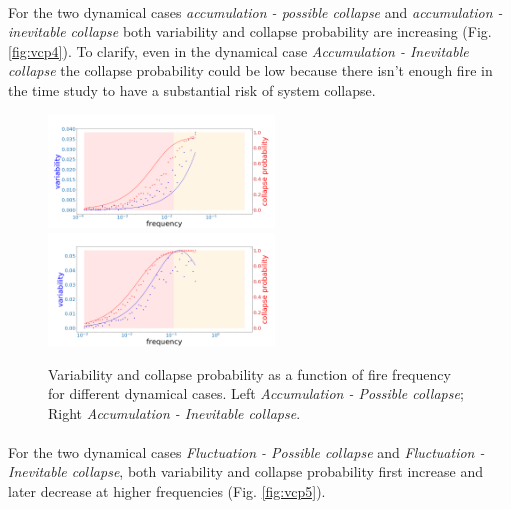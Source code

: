 \documentclass{article}
\begin{document}
\paragraph{}
For the two dynamical cases \textit{accumulation - possible collapse} and \textit{accumulation - inevitable collapse} both variability and collapse probability are increasing (Fig. \ref{fig:vcp4}). To clarify, even in the dynamical case \textit{Accumulation - Inevitable collapse} the collapse probability could be low because there isn't enough fire in the time study to have a substantial risk of system collapse.

\begin{figure}[h!]
\begin{center}
\includegraphics[width=6cm]{results/measures_acc_possible.png}
\includegraphics[width=6cm]{results/measures_acc_inevitable.png} 
\end{center}
\caption{\label{fig:vcp4}Variability and collapse probability as a function of fire frequency for different dynamical cases. Left \textit{Accumulation - Possible collapse}; Right \textit{Accumulation - Inevitable collapse}.}
\label{acc_possible_and_inevitable}
\end{figure}

\paragraph{}
For the two dynamical cases \textit{Fluctuation - Possible collapse} and \textit{Fluctuation - Inevitable collapse}, both variability and collapse probability first increase and later decrease at higher frequencies (Fig. \ref{fig:vcp5}). 
\end{document}
